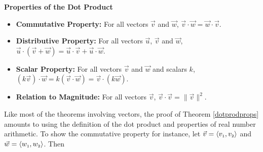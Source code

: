 \colorbox{ResultColor}{\bbm

\begin{thm} \label{dotprodprops} \textbf{Properties of the Dot Product}   

\begin{itemize}

\item  \textbf{Commutative Property:}  For all vectors $\vec{v}$ and $\vec{w}$, $\vec{v} \cdot \vec{w} = \vec{w} \cdot \vec{v}$.   

\item  \textbf{Distributive Property:}  For all vectors $\vec{u}$, $\vec{v}$ and $\vec{w}$, $\vec{u} \cdot \left(\vec{v} + \vec{w}\right) = \vec{u} \cdot \vec{v} + \vec{u} \cdot \vec{w}$.   

\item  \textbf{Scalar Property:}  For all vectors $\vec{v}$ and $\vec{w}$ and scalars $k$, $ (k \vec{v}) \cdot \vec{w} = k(\vec{v} \cdot \vec{w}) = \vec{v} \cdot (k \vec{w})$.

\item  \textbf{Relation to Magnitude:}  For all vectors $\vec{v}$, $\vec{v} \cdot \vec{v} = \| \vec{v} \|^2$.   

\end{itemize}

\end{thm}

\ebm}

\smallskip

Like most of the theorems involving vectors, the proof of Theorem \ref{dotprodprops} amounts to using the definition of the dot product and properties of real number arithmetic.  To show the commutative property for instance, let $\vec{v} = \left<v_{\mbox{\tiny $1$}},v_{\mbox{\tiny $2$}}\right>$ and $\vec{w} = \left<w_{\mbox{\tiny $1$}},w_{\mbox{\tiny $2$}}\right>$.  Then

